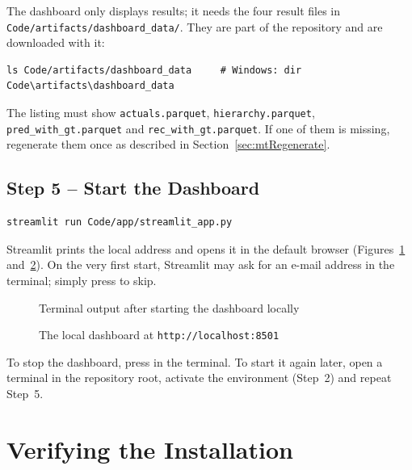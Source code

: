 The dashboard only displays results; it needs the four result files in \\
 \texttt{Code/artifacts/dashboard\_data/}. They are part of the repository and are downloaded with it:

\begin{lstlisting}[style=shell]
ls Code/artifacts/dashboard_data     # Windows: dir Code\artifacts\dashboard_data
\end{lstlisting}

The listing must show \texttt{actuals.parquet}, \texttt{hierarchy.parquet}, \texttt{pred\_with\_gt.parquet} and \texttt{rec\_with\_gt.parquet}. If one of them is missing, regenerate them once as described in Section~\ref{sec:mtRegenerate}.

\subsection{Step 5 -- Start the Dashboard}

\begin{lstlisting}[style=shell]
streamlit run Code/app/streamlit_app.py
\end{lstlisting}

Streamlit prints the local address and opens it in the default browser (Figures~\ref{fig:localTerminal} and~\ref{fig:localBrowser}). On the very first start, Streamlit may ask for an e-mail address in the terminal; simply press  to skip.

\begin{figure}[H]
  \centering
  \caption{Terminal output after starting the dashboard locally}
  \label{fig:localTerminal}
\end{figure}

\begin{figure}[H]
  \centering
  \caption{The local dashboard at \texttt{http://localhost:8501}}
  \label{fig:localBrowser}
\end{figure}

To stop the dashboard, press  in the terminal. To start it again later, open a terminal in the repository root, activate the environment (Step~2) and repeat Step~5.

\section{Verifying the Installation}
\label{sec:instVerify}

